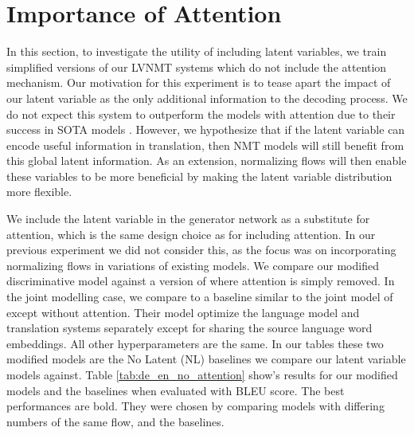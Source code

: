 




\section{Importance of Attention}

In this section, to investigate the utility of including latent variables, we train simplified versions of our \ac{LVNMT} systems which do not include the attention mechanism. Our motivation for this experiment is to tease apart the impact of our latent variable as the only additional information to the decoding process. We do not expect this system to outperform the models with attention due to their success in \ac{SOTA} models \cite{bahdanau2014NMTBYJoint, vaswani2017attentionTransformer}. However, we hypothesize that if the latent variable can encode useful information in translation, then \ac{NMT} models will still benefit from this global latent information. As an extension, normalizing flows will then enable these variables to be more beneficial by making the latent variable distribution more flexible.

We include the latent variable in the generator network as a substitute for attention, which is the same design choice as \citet{bahdanau2014NMTBYJoint} for including attention. In our previous experiment we did not consider this, as the focus was on incorporating normalizing flows in variations of existing models. We compare our modified discriminative model against a version of \citet{bahdanau2014NMTBYJoint} where attention is simply removed. In the joint modelling case, we compare to a baseline similar to the joint model of \citet{eikema2018AEVNMT} except without attention. Their model optimize the language model and translation systems separately except for sharing the source language word embeddings. All other hyperparameters are the same. In our tables these two modified models are the No Latent (NL) baselines we compare our latent variable models against. Table \ref{tab:de_en_no_attention} show's results for our modified models and the baselines when evaluated with BLEU score. The best performances are bold. They were chosen by comparing models with differing numbers of the same flow, and the baselines.

